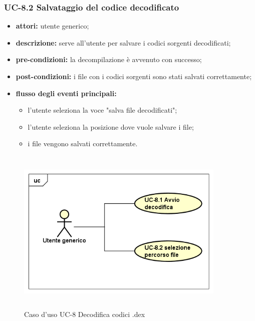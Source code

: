 \subsubsection*{UC-8.2 Salvataggio del codice decodificato}
\begin{itemize}
    \item \textbf{attori:} utente generico;
    \item \textbf{descrizione:} serve all'utente per salvare i codici sorgenti decodificati;
    \item \textbf{pre-condizioni:} la decompilazione è avvenuto con successo;
    \item \textbf{post-condizioni:} i file con i codici sorgenti sono stati salvati correttamente;
    \item \textbf{flusso degli eventi principali:}
    \begin{itemize}
        \item l'utente seleziona la voce "salva file decodificati";
        \item l'utente seleziona la posizione dove vuole salvare i file;
        \item i file vengono salvati correttamente.
    \end{itemize}
\end{itemize}

\begin{figure}[H]
    \centering
    \includegraphics[width=10cm, height=8cm]{./immagini/usecase/uc_8.png}
    \caption{Caso d'uso UC-8 Decodifica codici .dex}
\end{figure}



